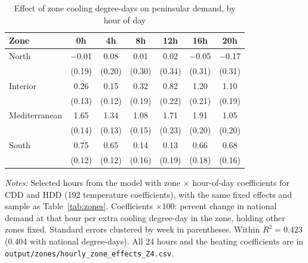\documentclass[11pt]{article}
\begin{document}
\begin{table}[htbp]
\centering
\begin{threeparttable}
\caption{Effect of zone cooling degree-days on peninsular demand, by hour of day}
\label{tab:zones_hourly}
\begin{tabular}{@{}lcccccc@{}}
\toprule
Zone & 0h & 4h & 8h & 12h & 16h & 20h \\
\midrule
North         & $-$0.01 & 0.08 & 0.01 & 0.02 & $-$0.05 & $-$0.17 \\
              & (0.19) & (0.20) & (0.30) & (0.34) & (0.31) & (0.31) \\
Interior      & 0.26 & 0.15 & 0.32 & 0.82 & 1.20 & 1.10 \\
              & (0.13) & (0.12) & (0.19) & (0.22) & (0.21) & (0.19) \\
Mediterranean & 1.65 & 1.34 & 1.08 & 1.71 & 1.91 & 1.05 \\
              & (0.14) & (0.13) & (0.15) & (0.23) & (0.20) & (0.20) \\
South         & 0.75 & 0.65 & 0.14 & 0.13 & 0.66 & 0.68 \\
              & (0.12) & (0.12) & (0.16) & (0.19) & (0.18) & (0.16) \\
\bottomrule
\end{tabular}
\begin{tablenotes}[flushleft]\footnotesize
\item \textit{Notes:} Selected hours from the model with zone $\times$ hour-of-day
coefficients for CDD and HDD (192 temperature coefficients), with the same fixed
effects and sample as Table~\ref{tab:zones}. Coefficients $\times 100$: percent
change in national demand at that hour per extra cooling degree-day in the zone,
holding other zones fixed. Standard errors clustered by week in parentheses.
Within $R^2 = 0.423$ (0.404 with national degree-days). All 24 hours and the
heating coefficients are in \texttt{output/zones/hourly\_zone\_effects\_Z4.csv}.
\end{tablenotes}
\end{threeparttable}
\end{table}
\end{document}
